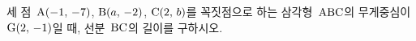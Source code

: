 세 점~$\mathrm{A}(-1,\,-7)$, $\mathrm{B}(a,\,-2)$, $\mathrm{C}(2,\,b)$를 꼭짓점으로 하는 삼각형~$\mathrm{ABC}$의 무게중심이 $\mathrm{G}(2,\,-1)$일 때, 선분~$\mathrm{BC}$의 길이를 구하시오.
